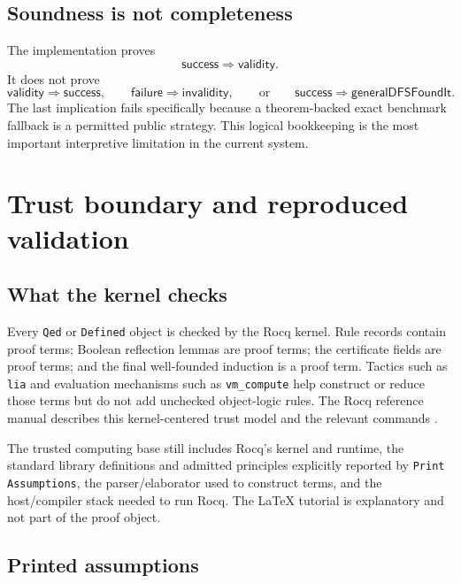 \documentclass[11pt,oneside]{book}
\DeclareRobustCommand{\code}[1]{\nolinkurl{#1}}
\begin{document}
\section{Soundness is not completeness}

The implementation proves
\[
 \mathsf{success}\Rightarrow\mathsf{validity}.
\]
It does not prove
\[
 \mathsf{validity}\Rightarrow\mathsf{success},
 \qquad
 \mathsf{failure}\Rightarrow\mathsf{invalidity},
 \qquad\text{or}\qquad
 \mathsf{success}\Rightarrow\mathsf{generalDFSFoundIt}.
\]
The last implication fails specifically because a theorem-backed exact
benchmark fallback is a permitted public strategy.  This logical bookkeeping
is the most important interpretive limitation in the current system.

\chapter{Trust boundary and reproduced validation}
\label{ch:trust}

\section{What the kernel checks}

Every \code{Qed} or \code{Defined} object is checked by the Rocq kernel.  Rule
records contain proof terms; Boolean reflection lemmas are proof terms; the
certificate fields are proof terms; and the final well-founded induction is a
proof term.  Tactics such as \code{lia} and evaluation mechanisms such as
\code{vm_compute} help construct or reduce those terms but do not add unchecked
object-logic rules.  The Rocq reference manual describes this kernel-centered
trust model and the relevant commands \cite{rocq91manual}.

The trusted computing base still includes Rocq's kernel and runtime, the
standard library definitions and admitted principles explicitly reported by
\code{Print Assumptions}, the parser/elaborator used to construct terms, and the
host/compiler stack needed to run Rocq.  The LaTeX tutorial is explanatory and
not part of the proof object.

\section{Printed assumptions}
\end{document}
